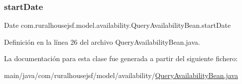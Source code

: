 \mbox{\label{classcom_1_1ruralhousejsf_1_1model_1_1availability_1_1_query_availability_bean_a1652bdd9864dc46b9c0fb5e31282032d}} 
\subsubsection{\texorpdfstring{startDate}{startDate}}
{\footnotesize\ttfamily Date com.\+ruralhousejsf.\+model.\+availability.\+Query\+Availability\+Bean.\+start\+Date\hspace{0.3cm}{\ttfamily [private]}}



Definición en la línea 26 del archivo Query\+Availability\+Bean.\+java.



La documentación para esta clase fue generada a partir del siguiente fichero\+:\begin{DoxyCompactItemize}
\item 
main/java/com/ruralhousejsf/model/availability/\mbox{\hyperlink{_query_availability_bean_8java}{Query\+Availability\+Bean.\+java}}\end{DoxyCompactItemize}
